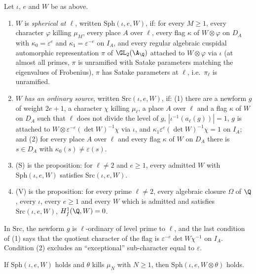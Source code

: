 \begin{definition}\label{pf:kato:def:sph}
Let $\iota$, $e$ and $W$ be as above.
\begin{enumerate}[label=(\roman*)]
\item $W$ is \emph{spherical at $\ell$}, written $\mathrm{Sph}(\iota,e,W)$, if: for every $M\ge1$, every character
  $\varphi$ killing $\mu_M$, every place $A$ over $\ell$, every flag $\kappa$ of $W\otimes\varphi$ on $D_A$ with
  $\kappa_0=\varepsilon^e$ and $\kappa_1=\varepsilon^{-e}$ on $I_A$, and every regular algebraic cuspidal automorphic representation
  $\pi$ of $\GL_2(\A_\Q)$ attached to $W\otimes\varphi$ via $\iota$ (at almost all primes, $\pi$ is unramified with Satake
  parameters matching the eigenvalues of Frobenius), $\pi$ has Satake parameters at $\ell$, i.e.\ $\pi_\ell$ is
  unramified.
\item $W$ \emph{has an ordinary source}, written $\mathrm{Src}(\iota,e,W)$, if: (1) there are a newform $g$ of weight
  $2e+1$, a character $\chi$ killing $\mu_\ell$, a place $A$ over $\ell$ and a flag $\kappa$ of $W$ on $D_A$ such that
  $\ell$ does not divide the level of $g$, $|\iota^{-1}(a_\ell(g))|=1$, $g$ is attached to
  $W\otimes\varepsilon^{-e}(\det W)^{-1}\chi$ via $\iota$, and $\kappa_1\varepsilon^e(\det W)^{-1}\chi=1$ on $I_A$; and (2) for
  every place $A$ over $\ell$ and every flag $\kappa$ of $W$ on $D_A$ there is $s\in D_A$ with
  $\kappa_0(s)\ne\varepsilon(s)$.
\item \textup{(S)} is the proposition: for $\ell\ne2$ and $e\ge1$, every admitted $W$ with
  $\mathrm{Sph}(\iota,e,W)$ satisfies $\mathrm{Src}(\iota,e,W)$.
\item \textup{(V)} is the proposition: for every prime $\ell\ne2$, every algebraic closure $\Omega$ of
  $\Q$, every $\iota$, every $e\ge1$ and every $W$ which is admitted and satisfies $\mathrm{Src}(\iota,e,W)$,
  $\katoHf(\Q,W)=0$.
\end{enumerate}
\end{definition}

In $\mathrm{Src}$, the newform $g$ is $\ell$-ordinary of level prime to $\ell$, and the last condition of (1)
says that the quotient character of the flag is $\varepsilon^{-e}\det W\chi^{-1}$ on $I_A$. Condition (2) excludes
an ``exceptional'' sub-character equal to $\varepsilon$.

\begin{lemma}\label{pf:kato:sphtw}
If $\mathrm{Sph}(\iota,e,W)$ holds and $\theta$ kills $\mu_N$ with $N\ge1$, then $\mathrm{Sph}(\iota,e,W\otimes\theta)$
holds. 
\end{lemma}

